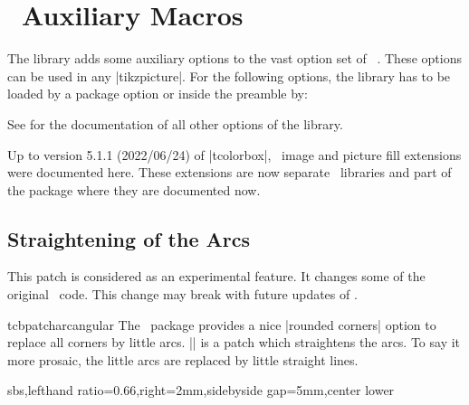 \clearpage
\section{\tikzname\ Auxiliary Macros}\label{sec:tikzimagefilling}%
%
The  library adds some auxiliary options to the vast option set of
\tikzname\ \cite{tantau:tikz_and_pgf}. These options can be used in any |tikzpicture|.
For the following options, the  library has to be loaded
by a package option or inside the preamble by:
\begin{dispListing}
\end{dispListing}

See  for the documentation of all other options of the  library.

\begin{marker}
Up to version 5.1.1 (2022/06/24) of |tcolorbox|, \tikzname\ image and picture fill extensions
were documented here. These extensions are now separate \tikzname\ libraries
and part of the  package where they are documented now.
\end{marker}


\subsection{Straightening of the Arcs}

\begin{marker}
This patch is considered as an experimental feature.
It changes some of the original \tikzname\ code. This change may break
with future updates of \tikzname.
\end{marker}

\begin{docCommand}[doc new=2014-05-05]{tcbpatcharcangular}{}
The \tikzname\ package provides a nice |rounded corners| option to replace
all corners by little arcs. |\tcbpatcharcangular| is a patch which
straightens the arcs. To say it more prosaic, the little arcs are replaced
by little straight lines.

\begin{dispExample*}{sbs,lefthand ratio=0.66,right=2mm,sidebyside gap=5mm,center lower}
\end{dispExample*}

\end{docCommand}


